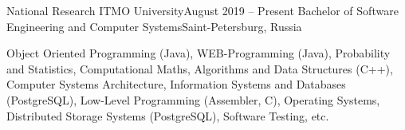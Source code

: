 

\begin{cvHeadingList}

  \cvCustomHeading
    {National Research ITMO University}{August 2019 – Present}
    {Bachelor of Software Engineering and Computer Systems}{Saint-Petersburg, Russia}

  \begin{cvList}
    \cvItem[Cources]
      Object Oriented Programming (Java),
      WEB-Programming (Java),
      Probability and Statistics,
      Computational Maths,
      Algorithms and Data Structures (C++),
      Computer Systems Architecture,
      Information Systems and Databases (PostgreSQL),
      Low-Level Programming (Assembler, C),
      Operating Systems,
      Distributed Storage Systems (PostgreSQL),
      Software Testing, etc.
  \end{cvList}

\end{cvHeadingList}
